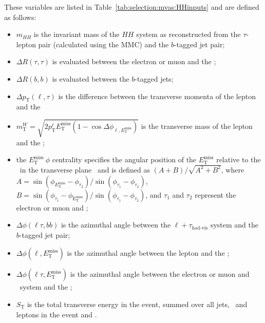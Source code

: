 These variables are listed in Table~\ref{tab:selection:mvas:HHinputs}
and are defined as follows:
\begin{itemize}
\item $m_{HH}$ is the invariant mass of the $HH$ system 
as reconstructed from the $\tau$-lepton pair (calculated using the MMC) and the $b$-tagged jet pair;
\item $\Delta R(\tau, \tau)$ is evaluated between the electron or muon and the \tauhad;
\item $\Delta R(b, b)$ is evaluated between the $b$-tagged jets;
\item $\Delta p_\text{T}(\ell, \tau)$ is the difference 
between the transverse momenta of the lepton and the \tauhad\;
\item $m_\text{T}^W =\sqrt{2p_\text{T}^\ell E_\text{T}^\text{miss}(1-\cos\Delta\phi_{\ell,E_\text{T}^\text{miss}})}$ 
is the transverse mass of the lepton and the \met;
\item the $E_\text{T}^\text{miss}~\phi$ centrality specifies 
the angular position of the $E_\text{T}^{\text{miss}}$ 
relative to the \tauhad\ in the transverse plane~\cite{HIGG-2013-32} 
and is defined as $(A+B)/\sqrt{A^2+B^2}$, 
where $A=\sin(\phi_{E_\text{T}^\text{miss}}-\phi_{\tau_2})/\sin(\phi_{\tau_1}-\phi_{\tau_2})$,
$B=\sin(\phi_{\tau_1}-\phi_{\mathrm{E}_\text{T}^\text{miss}})/\sin(\phi_{\tau_1}-\phi_{\tau_2})$, 
and $\tau_1$ and $\tau_2$ represent the electron or muon and \tauhad;
\item $\Delta\phi(\ell\tau, bb)$ is the azimuthal angle between the $\ell+\tau_\text{had-vis}$ system and the $b$-tagged jet pair;
\item $\Delta\phi(\ell, E_\text{T}^\text{miss})$ is the 
azimuthal angle between the lepton and the \met;
\item $\Delta\phi(\ell\tau, E_\text{T}^\text{miss})$ is the 
azimuthal angle between the electron or muon and \tauhad\ system and the \met;
\item $S_\text{T}$ is the total transverse energy in the event, summed over all jets, 
\tauhad\ and leptons in the event and \met.%
\end{itemize}


